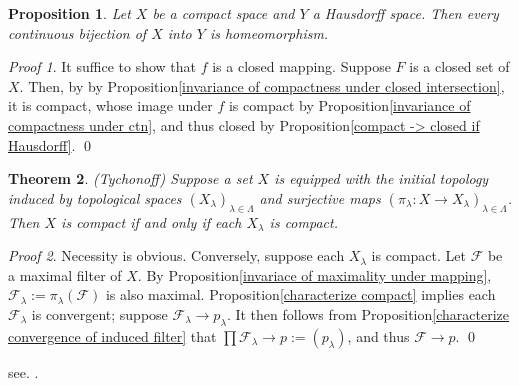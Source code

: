 \documentclass[a4paper,12pt]{article}
\newtheorem{thm}{Theorem}[section]
\newtheorem{prp}[thm]{Proposition}
\theoremstyle{remark}
\newtheorem*{prf}{Proof}
\theoremstyle{definition}
\theoremstyle{definition}
\theoremstyle{definition}
\begin{document}
\begin{prp}
	Let \( X \) be a compact space and \( Y \) a Hausdorff space.
	Then every continuous bijection of \( X \) into \( Y \) is homeomorphism.
\end{prp}
\begin{prf}
	It suffice to show that \( f \) is a closed mapping. Suppose \( F \) is a closed set of \( X \). Then, by by Proposition\ref{invariance of compactness under closed intersection}, it is compact, whose image under \( f \) is compact by Proposition\ref{invariance of compactness under ctn}, and thus closed by Proposition\ref{compact -> closed if Hausdorff}.
	\qed\end{prf}

\begin{thm} (Tychonoff)
	Suppose a set \( X \) is equipped with the initial topology induced by topological spaces \( (X_{\lambda})_{\lambda \in \Lambda} \) and surjective maps \( (\pi_{\lambda}: X \to X_{\lambda})_{\lambda \in \Lambda} \).
	Then \( X \) is compact if and only if each \( X_{\lambda} \) is compact.
\end{thm}
\begin{prf}
	Necessity is obvious. Conversely, suppose each \( X_{\lambda} \) is compact.
	Let \( \mathscr{F} \) be a maximal filter of \( X \). By Proposition\ref{invariace of maximality under mapping}, \( \mathscr{F}_{\lambda}:=\pi_{\lambda}(\mathscr{F}) \) is also maximal. Proposition\ref{characterize compact} implies each \( \mathscr{F}_{\lambda} \) is convergent; suppose \( \mathscr{F}_{\lambda}\to p_{\lambda} \). It then follows from Proposition\ref{characterize convergence of induced filter} that \( \prod \mathscr{F}_{\lambda} \to p:=(p_{\lambda})\), and thus \( \mathscr{F} \to p \).
	\qed\end{prf}

see\cite{bour:tplgy}.
\cite{nagata:tplgy}.



\end{document}

